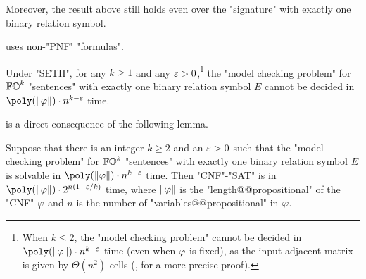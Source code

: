 Moreover, the result above still holds even over the "signature" with exactly one binary relation symbol.
\begin{sideyoshiki}
 uses non-"PNF" "formulas".
\end{sideyoshiki}
\begin{theorem}\label{theorem: FO3 model checking hardness 1 binary}
    Under "SETH",
    for any $k \ge 1$ and any $\varepsilon > 0$,\footnote{When $k \le 2$,
    the "model checking problem" cannot be decided in $\poly(\len{\fml}) \cdot n^{k - \eps}$ time (even when $\fml$ is fixed), as the input adjacent matrix is given by $\Theta(n^2)$ cells (, for a more precise proof).}
    the "model checking problem" for $\mathbb{FO}^{k}$ "sentences" with exactly one binary relation symbol $E$ cannot be decided in $\poly(\len{\fml}) \cdot n^{k - \eps}$ time.
\end{theorem}
 is a direct consequence of the following lemma.
\begin{lemma}\label{lemma: FO3 model checking hardness 1 binary}
    Suppose that there is an integer $k \ge 2$ and an $\varepsilon > 0$ such that
    the "model checking problem" for $\mathbb{FO}^{k}$ "sentences" with exactly one binary relation symbol $E$ is solvable in $\poly(\len{\fml}) \cdot n^{k - \eps}$ time. 
    Then "CNF"-"SAT" is in $\poly(\len{\fml}) \cdot 2^{n (1 - \eps/k)}$ time,
    where $\len{\fml}$ is the "length@@propositional" of the "CNF" $\fml$ and $n$ is the number of "variables@@propositional" in $\fml$.
\end{lemma}
